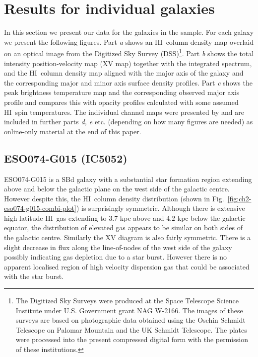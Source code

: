\documentclass[traditabstract]{aa} %
\newcommand\HI{H{\small I}}
\begin{document}
\section{Results for individual galaxies}
\label{sec:ch2-results}


In this section we present our data for the galaxies in the sample.
For each galaxy we present the following figures. Part {\em a} shows
an \HI\ column density map overlaid on an optical image from the
Digitized Sky Survey (DSS)\footnote{The Digitized Sky Surveys were
produced at the Space Telescope Science Institute under U.S.
Government grant NAG W-2166. The images of these surveys are based
on photographic data obtained using the Oschin Schmidt Telescope
on Palomar Mountain and the UK Schmidt Telescope. The plates were
processed into the present compressed digital form with the permission
of these institutions.}. Part {\em b} shows the total intensity
position-velocity map (XV map) together with the integrated spectrum,
and the \HI\ column density map aligned with the major axis of the
galaxy and the corresponding major and minor axis surface density
profiles.  Part {\em c} shows the peak brightness temperature map
and the corresponding observed major axis profile and compares this
with opacity profiles calculated with some assumed \HI\ spin
temperatures. The individual channel maps were presented
by \citet{jobrien2007} and are included in further parts {\em d, e} etc.
(depending on how many figures are needed)  as online-only material
at the end of this paper.


\subsection{ESO074-G015 (IC5052)}

ESO074-G015 is a SBd galaxy with a substantial star formation region
extending above and below the galactic plane on the west side of the
galactic centre. However despite this, the \HI\ column density
distribution (shown in Fig.~\ref{fig:ch2-eso074-g015-combi-plot}) is
surprisingly symmetric. Although there is extensive high latitude \HI\
gas extending to $3.7$ kpc above and $4.2$ kpc below the galactic equator,
the distribution of elevated gas appears to be similar on both sides
of the galactic centre. Similarly the XV diagram is also fairly 
symmetric. There is a slight decrease in flux along the line-of-nodes
of the west side of the galaxy possibly indicating gas depletion due 
to a star burst. However
there is no apparent localised region of high velocity dispersion gas
that could be associated with the star burst.
\end{document}
